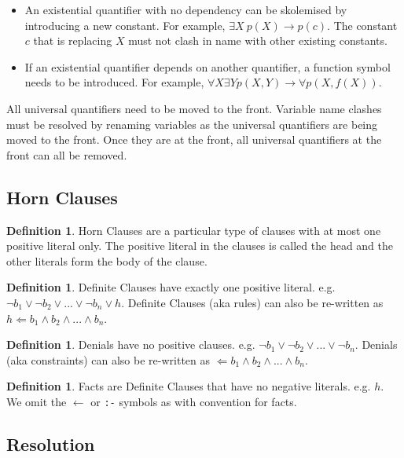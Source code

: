 \documentclass{article}
\theoremstyle{plain}
\theoremstyle{definition}
\newtheorem{defn}[thm]{Definition} %
\begin{document}
\begin{multicols}{2}
\begin{itemize}
\item An existential quantifier with no dependency can be skolemised by introducing a new constant. For example, $\exists X\ p(X) \longrightarrow p(c)$. The constant $c$ that is replacing $X$ must not clash in name with other existing constants.
\item If an existential quantifier depends on another quantifier, a function symbol needs to be introduced. For example, $\forall X \exists Y p(X, Y) \longrightarrow \forall p(X, f(X))$.
\end{itemize}

\noindent All universal quantifiers need to be moved to the front. Variable name clashes must be resolved by renaming variables as the universal quantifiers are being moved to the front. Once they are at the front, all universal quantifiers at the front can all be removed. 

\subsection{Horn Clauses}

\begin{defn}Horn Clauses are a particular type of clauses with at most one positive literal only. The positive literal in the clauses is called the head and the other literals form the body of the clause.\end{defn}

\begin{defn}Definite Clauses have exactly one positive literal.  e.g. $\lnot b_1 \lor\lnot b_2 \lor ... \lor\lnot b_n \lor h$. Definite Clauses (aka rules) can also be re-written as $h \Leftarrow b_1 \land b_2 \land ... \land b_n$.\end{defn}

\begin{defn}Denials have no positive clauses. e.g. $\lnot b_1 \lor\lnot b_2 \lor ... \lor\lnot b_n$. Denials (aka constraints) can also be re-written as $\Leftarrow b_1 \land b_2 \land ... \land b_n$.\end{defn}

\begin{defn}Facts are Definite Clauses that have no negative literals. e.g. $h$. We omit the $\leftarrow$  or \lstinline{:-} symbols as with convention for facts.\end{defn}

\subsection{Resolution}\label{sec:Resolution}


\end{multicols}
\end{document}
